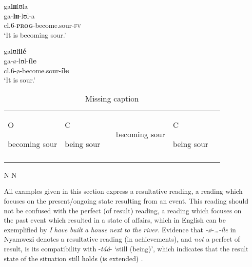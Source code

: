 \documentclass[output=paper,newtxmath,modfonts,nonflat,draftmode]{langsci/langscibook}
\begin{document}
\ea \label{ex:kanijo:16}
    \ea 
    \glll ga\textbf{lɪɪ}lʊla\\
    ga-\textbf{lɪɪ}-lʊl-a\\
    cl.6-\textbf{\textsc{prog}}-become.sour-\textsc{fv}\\
    \glt ‘It is becoming sour.’
    
    \ex 
    \glll galʊl\textbf{ilé}\\
    ga-ø-lʊl-\textbf{íle}\\
    cl.6-ø-become.sour-\textbf{íle}\\
    \glt ‘It is sour.’
    
    \z
\z
    
\begin{table}
\begin{tabularx}{\textwidth}{XXXXXX}
\lsptoprule
\hhline{--~~--}
 O\par


becoming sour & C\par

being sour &  & %

 becoming sour & C\par

\par

 being sour\\
\hhline{--~~--}
\end{tabularx}
                N             N 
\caption{{\color{red} Missing caption}}                
\end{table} 

                
All examples given in this section express a resultative reading, a reading which focuses on the present/ongoing state resulting from an event. This reading should not be confused with the perfect (of result) reading, a reading which focuses on the past event which resulted in a state of affairs, which in English can be exemplified by \textit{I} \textit{have} \textit{built} \textit{a} \textit{house} \textit{next} \textit{to} \textit{the} \textit{river}. Evidence that \textit{-ø}\textit{-…-íle} in Nyamwezi denotes a resultative reading (in achievements), and \textit{not} a perfect of result, is its compatibility with -\textit{táá}- ‘still (being)’, which indicates that the result state of the situation still holds (is extended) . 
\end{document}
